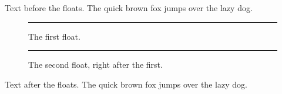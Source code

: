 \documentclass{article}
\begin{document}
Text before the floats. The quick brown fox jumps over the lazy dog.

\begin{figure}[t]
\centering
\rule{3cm}{1cm}
\caption{The first float.}
\end{figure}
\begin{figure}[t]
\centering
\rule{4cm}{1cm}
\caption{The second float, right after the first.}
\end{figure}
Text after the floats. The quick brown fox jumps over the lazy dog.
\end{document}
